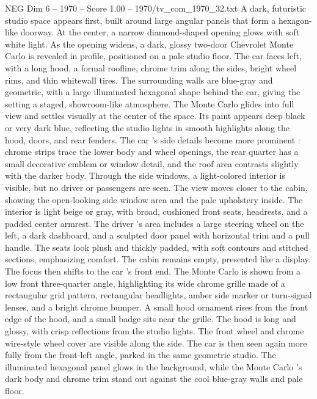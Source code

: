 \begin{textsample}{NEG Dim 6 – 1970 – Score 1.00 – 1970/tv\_com\_1970\_32.txt}  \label{ex:f6_neg_055}
A dark, futuristic studio space appears first, built around large angular panels that form a hexagon-like doorway.
At the center, a narrow diamond-shaped opening glows with soft white light.
As the opening widens, a dark, glossy two-door Chevrolet Monte Carlo is revealed in profile, positioned on a pale studio floor.
The car faces left, with a long hood, a formal roofline, chrome trim along the sides, bright wheel rims, and thin whitewall tires.
The surrounding walls are blue-gray and geometric, with a large illuminated hexagonal shape behind the car, giving the setting a staged, showroom-like atmosphere.
The Monte Carlo glides into full view and settles visually at the center of the space.
Its paint appears deep black or very dark blue, reflecting the studio lights in smooth highlights along the hood, doors, and rear fenders.
The car ’s side details become more prominent : chrome strips trace the lower body and wheel openings, the rear quarter has a small decorative emblem or window detail, and the roof area contrasts slightly with the darker body.
Through the side windows, a light-colored interior is visible, but no driver or passengers are seen.
The view moves closer to the cabin, showing the open-looking side window area and the pale upholstery inside.
The interior is light beige or gray, with broad, cushioned front seats, headrests, and a padded center armrest.
The driver ’s area includes a large steering wheel on the left, a dark dashboard, and a sculpted door panel with horizontal trim and a pull handle.
The seats look plush and thickly padded, with soft contours and stitched sections, emphasizing comfort.
The cabin remains empty, presented like a display.
The focus then shifts to the car ’s front end.
The Monte Carlo is shown from a low front three-quarter angle, highlighting its wide chrome grille made of a rectangular grid pattern, rectangular headlights, amber side marker or turn-signal lenses, and a bright chrome bumper.
A small hood ornament rises from the front edge of the hood, and a small badge sits near the grille.
The hood is long and glossy, with crisp reflections from the studio lights.
The front wheel and chrome wire-style wheel cover are visible along the side.
The car is then seen again more fully from the front-left angle, parked in the same geometric studio.
The illuminated hexagonal panel glows in the background, while the Monte Carlo ’s dark body and chrome trim stand out against the cool blue-gray walls and pale floor.

\end{textsample}
